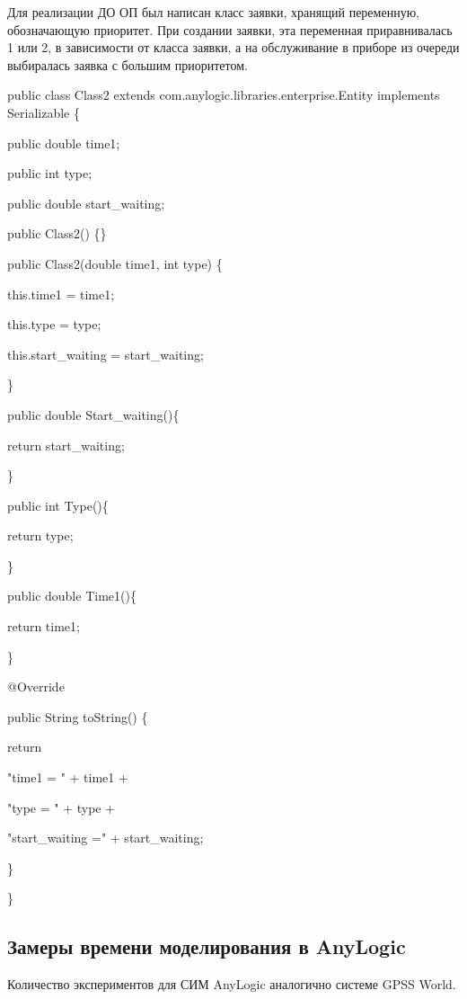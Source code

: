 \documentclass[a4paper,14pt]{report} %
\begin{document}
Для реализации ДО ОП был написан класс заявки, хранящий переменную, обозначающую приоритет. При создании заявки, эта переменная приравнивалась 1 или 2, в зависимости от класса заявки, а на обслуживание в приборе из очереди выбиралась заявка с большим приоритетом. 
\vspace{0.5cm} \par\noindent
public class Class2 extends com.anylogic.libraries.enterprise.Entity implements Serializable \{\par\noindent
public double time1;\par\noindent
public int type;\par\noindent
public double start\_waiting;\par\noindent
public Class2() \{\}\par\noindent
public Class2(double time1, int type) \{\par
this.time1 = time1;\par
this.type = type;\par\noindent
this.start\_waiting = start\_waiting;\par\noindent
\} \par\noindent
public double Start\_waiting()\{\par
return start\_waiting;\par\noindent
\}\par\noindent
public int Type()\{\par
return type;\par\noindent
\}\par\noindent
public double Time1()\{\par
return time1;\par\noindent
\}\par\noindent
@Override\par\noindent
public String toString() \{\par
return  \par
"time1 = " + time1 + \par
"type = " + type + \par
"start\_waiting =" + start\_waiting; \par
\}\par\noindent
\}\par

\subsection{Замеры времени моделирования в AnyLogic}
Количество экспериментов для СИМ AnyLogic аналогично системе GPSS World.
\end{document}
